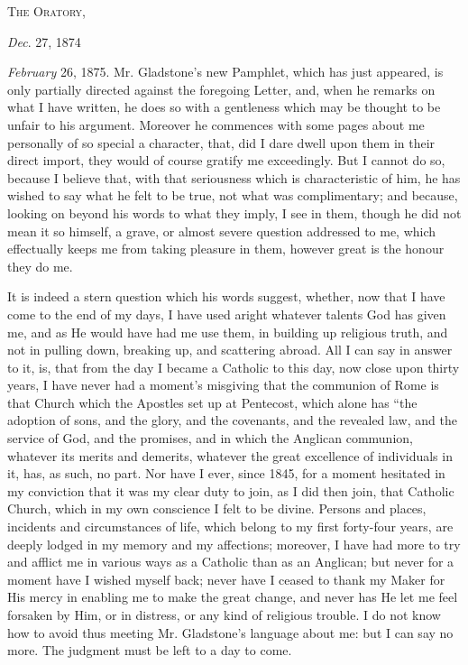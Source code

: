 T\textsc{he} O\textsc{ratory},

\emph{Dec}. 27, 1874


\emph{February} 26, 1875. Mr. Gladstone's new Pamphlet, which
has just appeared, is only partially directed against the foregoing
Letter, and, when he remarks on what I have written, he does so with a
gentleness which may be thought to be unfair to his argument. Moreover
he commences with some pages about me personally of so special a
character, that, did I dare dwell upon them in their direct import, they
would of course gratify me exceedingly. But I cannot do so, because I
believe that, with that seriousness which is characteristic of him, he
has wished to say what he felt to be true, not what was complimentary;
and because, looking on beyond his words to what they imply, I see in
them, though he did not mean it so himself, a grave, or almost severe
question addressed to me, which effectually keeps me from taking
pleasure in them, however great is the honour they do me.

It is indeed a stern question which his words suggest, whether, now
that I have come to the end of my days, I have used aright whatever
talents God has given me, and as He would have had me use them, in
building up religious truth, and not in pulling down, breaking up, and
scattering abroad. All I can say in answer to it, is, that from the day
I became a Catholic to this day, now close upon thirty years, I have
never had a moment's misgiving that the communion of Rome is that
Church which the Apostles set up at Pentecost, which alone has ``the
adoption of sons, and the glory, and the covenants, and the revealed
law, and the service of God, and the promises, and in which the Anglican
communion, whatever its merits and demerits, whatever the great
excellence of individuals in it, has, as such, no part. Nor have I ever,
since 1845, for a moment hesitated in my conviction that it was my clear
duty to join, as I did then join, that Catholic Church, which in my own
conscience I felt to be divine. Persons and places, incidents and
circumstances of life, which belong to my first forty-four years, are
deeply lodged in my memory and my affections; moreover, I have had more
to try and afflict me in various ways as a Catholic than as an Anglican;
but never for a moment have I wished myself back; never have I ceased to
thank my Maker for His mercy in enabling me to make the great change,
and never has He let me feel forsaken by Him, or in distress, or any
kind of religious trouble. I do not know how to avoid thus meeting Mr.
Gladstone's language about me: but I can say no more. The judgment must
be left to a day to come.

